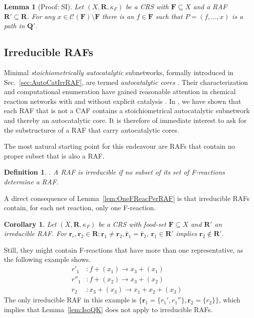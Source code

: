 \documentclass[pdflatex]{sn-jnl}
\theoremstyle{thmstyleone}%
\newtheorem{corollary}[theorem]{Corollary}%
\newtheorem{lemma}[theorem]{Lemma}%
\theoremstyle{examplesty}%
\theoremstyle{thmstylethree}%
\newtheorem{definition}[theorem]{Definition}%
\newcommand{\queen}{\mathbf{Q}}
\newcommand{\food}{\ensuremath{\mathbf{F}}}
\newcommand{\closure}[2]{\mathscr{C}_{#1}(#2)}
\newcommand{\FR}[0]{\mathbf{R}}
\newcommand{\fr}[0]{\mathbf{r}}
\newcommand{\RAF}[0]{\mathbf{R}'}
\newcommand{\cat}{\kappa_F}
\newcommand{\PFS}[1]{\begingroup\color{cyan}#1\endgroup}
\begin{document}
\vspace{6pt}
\begin{lemma}[Proof: SI]\label{lem:RAFPath}
  Let $(X, \FR, \cat)$ be a CRS with $\food \subseteq X$ and a RAF
  $\RAF\subseteq \FR$.  For any $x\in \closure{}{\food}\setminus \food$
  there is an $f\in \food$ such that $P=(f, \ldots, x)$ is a path in
  $\queen'$.
\end{lemma}

\subsection{Irreducible RAFs}\label{sec:IrrRAF}

Minimal \emph{stoichiometrically autocatalytic} subnetworks, formally
introduced in Sec.~\ref{sec:AutoCatIrrRAF}, are termed \emph{autocatalytic
cores} \cite{blokhuis_Universal_2020}. Their characterization and
computational enumeration have gained reasonable attention in chemical
reaction networks with and without explicit catalysis
\cite{blokhuis_Universal_2020, golnik_birne_2025, golnik_using_2026,
  golnik_autocatalytic_2026}.  In \cite{golnik_bridging_2026}, we have
shown that each RAF that is not a CAF contains a stoichiometrical
autocatalytic subnetwork and thereby an autocatalytic core. It is therefore
of immediate interest to ask for the substructures of a RAF that carry
autocatalytic cores.

The most natural starting point for this endeavour are RAFs that contain no
proper subset that is also a RAF.
\PFS{
\begin{definition}\cite{steel_minimal_2013}.
  A RAF is irreducible if no subset of its set of F-reactions determine a RAF. 
\end{definition}
}
A direct consequence of
Lemma~\ref{lem:OneFReacPerRAF} is that irreducible RAFs contain, for each
net reaction, only one F-reaction.
\vspace{6pt} 
\begin{corollary}
  Let $(X,\mathbf{R}, \cat)$ be a CRS with food-set $\food\subseteq X$ and
  $\RAF$ an irreducible RAF.  For $\fr_r,\fr_2 \in \mathbf{R}: \fr_1\neq
  \fr_2, \hat{\fr}_1=\hat{\fr}_2$, $\fr_1\in \RAF$ implies $\fr_2\notin
  \RAF$.
\end{corollary}
\vspace{6pt}
%
Still, they might contain F-reactions that have more than one
representative, as the following example shows.
\begin{equation}
  \begin{split}
    r'_1&: f + (x_1) \rightarrow x_3 + (x_1)\\
    r''_1&: f + (x_2) \rightarrow x_3 + (x_2)\\
    r_2&:  x_3 + (x_3) \rightarrow x_1 + x_2 + (x_3)
  \end{split}
\end{equation}
The only irreducible RAF in this example is $\{\fr_1=\{r_1',r_1''\},
\fr_2=\{r_2\}\}$, which implies that Lemma~\ref{lem:IsoQK} does not
\PFS{apply to} irreducible RAFs.
\end{document}
